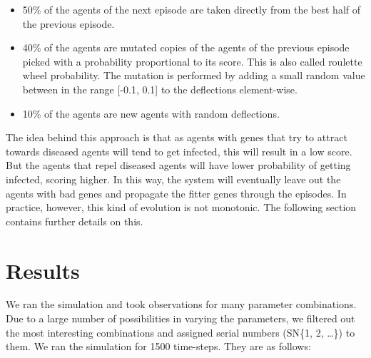 \documentclass[a4paper,11pt]{article}
\begin{document}
    \begin{itemize}
        \item 50\% of the agents of the next episode are taken directly from the best half of the previous episode.
        \item 40\% of the agents are mutated copies of the agents of the previous episode picked with a probability proportional to its score.
        This is also called roulette wheel probability.
        The mutation is performed by adding a small random value between in the range [-0.1, 0.1] to the deflections element-wise.
        \item 10\% of the agents are new agents with random deflections.
    \end{itemize}

    The idea behind this approach is that as agents with genes that try to attract towards diseased agents will tend to get infected, this will result in a low score.
    But the agents that repel diseased agents will have lower probability of getting infected, scoring higher.
    In this way, the system will eventually leave out the agents with bad genes and propagate the fitter genes through the episodes.
    In practice, however, this kind of evolution is not monotonic.
    The following section contains further details on this.

    \section{Results}\label{sec:results}
    We ran the simulation and took observations for many parameter combinations.
    Due to a large number of possibilities in varying the parameters, we filtered out the most interesting combinations and assigned serial numbers (SN\{1, 2, \ldots \}) to them.
    We ran the simulation for 1500 time-steps.
    They are as follows:
\end{document}
